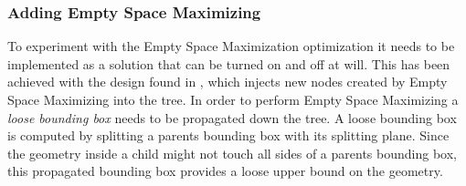\subsubsection{Adding Empty Space Maximizing}\label{sec:gpuEmptySpace}


To experiment with the Empty Space Maximization optimization it needs to be
implemented as a solution that can be turned on and off at will. This has been
achieved with the design found in , which
injects new nodes created by Empty Space Maximizing into the tree. In order to
perform Empty Space Maximizing a \textit{loose bounding box} needs to be
propagated down the tree. A loose bounding box is computed by splitting a
parents bounding box with its splitting plane. Since the geometry inside a child
might not touch all sides of a parents bounding box, this propagated bounding
box provides a loose upper bound on the geometry.

